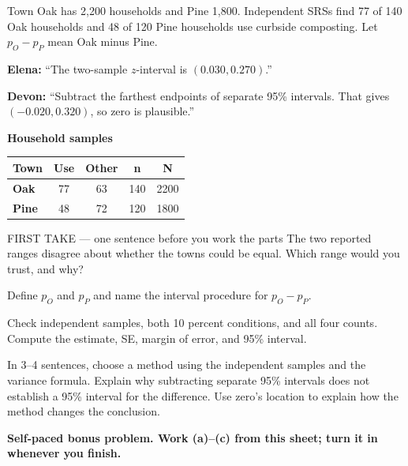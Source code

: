 \documentclass[14pt]{extarticle}
\begin{document}
\pagestyle{empty}


\noindent\begin{minipage}[t]{0.57\linewidth}
\vspace{0pt}
Town Oak has 2{,}200 households and Pine 1{,}800. Independent SRSs find 77 of 140 Oak households and 48 of 120 Pine households use curbside composting. Let $p_O-p_P$ mean Oak minus Pine.\par\smallskip \textbf{Elena:} ``The two-sample $z$-interval is $(0.030,0.270)$.''\par \textbf{Devon:} ``Subtract the farthest endpoints of separate 95\% intervals. That gives $(-0.020,0.320)$, so zero is plausible.''\par
\end{minipage}\hfill
\begin{minipage}[t]{0.40\linewidth}
\vspace{0pt}
\begin{center}
\textbf{Household samples}\par\smallskip
\begin{tabular}{|l|c|c|c|c|}
\hline
\textbf{Town} & \textbf{Use} & \textbf{Other} & \textbf{n} & \textbf{N} \\ \hline
\textbf{Oak} & 77 & 63 & 140 & 2200 \\ \hline
\textbf{Pine} & 48 & 72 & 120 & 1800 \\ \hline
\end{tabular}
\end{center}
\end{minipage}

\begin{firsttakebox}{FIRST TAKE --- one sentence before you work the parts}
The two reported ranges disagree about whether the towns could be equal. Which range would you trust, and why?
\end{firsttakebox}

\begin{description}[leftmargin=1.15in, labelwidth=1in, itemsep=2pt, topsep=2pt]
  \item[\dokbadge{1}~(a)] Define $p_O$ and $p_P$ and name the interval procedure for $p_O-p_P$.
  \item[\dokbadge{2}~(b)] Check independent samples, both 10 percent conditions, and all four counts. Compute the estimate, SE, margin of error, and 95\% interval.
  \item[\dokbadge{3}~(c)] In 3--4 sentences, choose a method using the independent samples and the variance formula. Explain why subtracting separate 95\% intervals does not establish a 95\% interval for the difference. Use zero's location to explain how the method changes the conclusion.
\end{description}

\vfill
\textbf{Self-paced bonus problem. Work (a)--(c) from this sheet; turn it in whenever you finish.}
\end{document}
